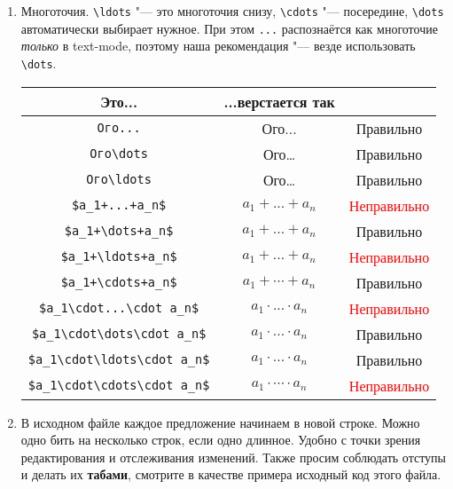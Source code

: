 \documentclass[12pt,a4paper]{book}
\newcommand{\ok}{& \textcolor{green!60!black}{Правильно}}
\newcommand{\bad}{& \textcolor{red}{Неправильно}}
\begin{document}
\begin{enumerate}
\item
	Многоточия.
	\verb!\ldots! "--- это многоточия снизу, \verb!\cdots! "--- посередине, \verb!\dots! автоматически выбирает нужное.
	При этом \verb!...! распознаётся как многоточие \textit{только} в text-mode, 
	поэтому наша рекомендация "--- везде использовать \verb!\dots!.
	\begin{center}\begin{tabular}{|c|c|c|}
		\hline Это... & ...верстается так & \\
		\hline \verb!Ого...! & Ого... \ok \\
		\hline \verb!Ого\dots! & Ого\dots \ok \\
		\hline \verb!Ого\ldots! & Ого\ldots \ok \\
		\hline \verb!$a_1+...+a_n$! & $a_1+...+a_n$ \bad \\
		\hline \verb!$a_1+\dots+a_n$! & $a_1+\dots+a_n$ \ok \\
		\hline \verb!$a_1+\ldots+a_n$! & $a_1+\ldots+a_n$ \bad \\
		\hline \verb!$a_1+\cdots+a_n$! & $a_1+\cdots+a_n$ \ok \\
		\hline \verb!$a_1\cdot...\cdot a_n$! & $a_1\cdot ... \cdot a_n$ \bad \\
		\hline \verb!$a_1\cdot\dots\cdot a_n$! & $a_1\cdot\dots\cdot a_n$ \ok \\
		\hline \verb!$a_1\cdot\ldots\cdot a_n$! & $a_1\cdot\ldots\cdot a_n$ \ok \\
		\hline \verb!$a_1\cdot\cdots\cdot a_n$! & $a_1\cdot\cdots\cdot a_n$ \bad \\
		\hline
	\end{tabular}\end{center}

\item
	В исходном файле каждое предложение начинаем в новой строке.
	Можно одно бить на несколько строк, если одно длинное.
	Удобно с точки зрения редактирования и отслеживания изменений.
	Также просим соблюдать отступы и делать их \textbf{табами}, смотрите в качестве примера исходный код этого файла.


\end{enumerate}
\end{document}
